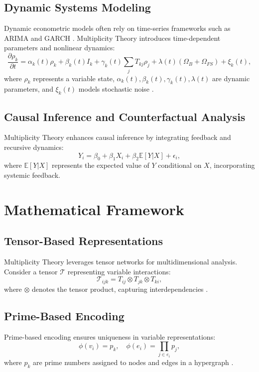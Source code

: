 \documentclass{article}
\theoremstyle{plain}
\begin{document}
\subsection{Dynamic Systems Modeling}
Dynamic econometric models often rely on time-series frameworks such as ARIMA \cite{box1970time} and GARCH \cite{brockwell2009time}. Multiplicity Theory introduces time-dependent parameters and nonlinear dynamics:
\begin{equation}
\frac{\partial \rho_k}{\partial t} = \alpha_k(t) \rho_k + \beta_k(t) I_k + \gamma_k(t) \sum_{j} T_{kj} \rho_j + \lambda(t)(\Omega_B + \Omega_{FS}) + \xi_k(t),
\end{equation}
where \( \rho_k \) represents a variable state, \( \alpha_k(t), \beta_k(t), \gamma_k(t), \lambda(t) \) are dynamic parameters, and \( \xi_k(t) \) models stochastic noise \cite{nielsen2010quantum, mitchell2009complexity}.

\subsection{Causal Inference and Counterfactual Analysis}
Multiplicity Theory enhances causal inference by integrating feedback and recursive dynamics:\cite{hall1988asymptotic}
\begin{equation}
Y_i = \beta_0 + \beta_1 X_i + \beta_2 \mathbb{E}[Y | X] + \epsilon_i,
\end{equation}
where \( \mathbb{E}[Y | X] \) represents the expected value of \( Y \) conditional on \( X \), incorporating systemic feedback.

\section{Mathematical Framework}

\subsection{Tensor-Based Representations}
Multiplicity Theory leverages tensor networks for multidimensional analysis. Consider a tensor \( \mathcal{T} \) representing variable interactions:
\begin{equation}
\mathcal{T}_{ijk} = T_{ij} \otimes T_{jk} \otimes T_{ki},
\end{equation}
where \( \otimes \) denotes the tensor product, capturing interdependencies \cite{barabasi2016network, nielsen2010quantum}.

\subsection{Prime-Based Encoding}
Prime-based encoding ensures uniqueness in variable representations:
\begin{equation}
\phi(v_i) = p_k, \quad \phi(e_i) = \prod_{j \in e_i} p_j,
\end{equation}
where \( p_k \) are prime numbers assigned to nodes and edges in a hypergraph \cite{shor1997polynomial}.
\end{document}
